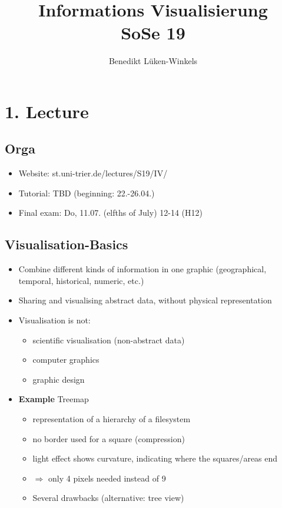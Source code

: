 \documentclass[ngerman]{scrartcl}
\title{Informations Visualisierung \\ SoSe 19}
\author{Benedikt Lüken-Winkels}
\begin{document}
\maketitle
\tableofcontents
\newpage

\section{1. Lecture}
\subsection{Orga}
\begin{itemize}
  \item Website: st.uni-trier.de/lectures/S19/IV/
  \item Tutorial: TBD (beginning: 22.-26.04.)
  \item Final exam: Do, 11.07. (elfths of July) 12-14 (H12)
\end{itemize}

\subsection{Visualisation-Basics}
\begin{itemize}
  \item Combine different kinds of information in one graphic (geographical, temporal, historical, numeric, etc.)
  \item Sharing and visualising abstract data, without physical representation 
  \item Visualisation is not:
  \begin{itemize}
    \item scientific visualisation (non-abstract data)
    \item computer graphics
    \item graphic design
  \end{itemize}
  \item \textbf{Example} Treemap
  \begin{itemize}
    \item representation of a hierarchy of a filesystem
    \item no border used for a square (compression)
    \item light effect shows curvature, indicating where the squares/areas end 
    \item $ \Rightarrow $ only 4 pixels needed instead of 9
    \item Several drawbacks (alternative: tree view)
  \end{itemize}
\end{itemize}
\end{document}
